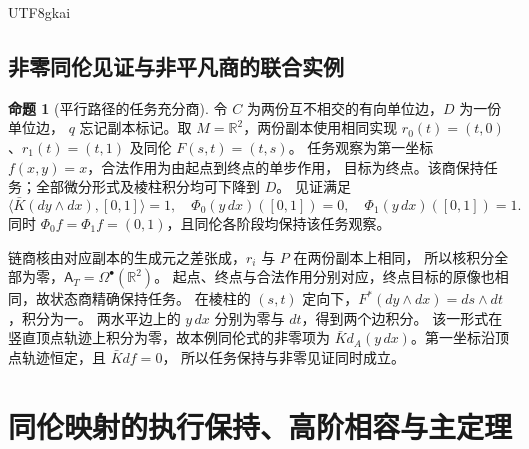 \documentclass[12pt]{report}
\makeatletter
\theoremstyle{definition}
\newtheorem{proposition}{命题}[chapter]
\renewenvironment{proof}[1][\proofname]{\par
  \pushQED{\qed}\normalfont
  \topsep6\p@\@plus6\p@\relax
  \trivlist
  \item[\hskip\labelsep\normalfont #1\@addpunct{.}]\ignorespaces
}{
  \popQED\endtrivlist\@endpefalse
}
\newcommand{\RR}{\mathbb R}
\makeatother
\begin{document}
\begin{CJK*}{UTF8}{gkai}
\section{非零同伦见证与非平凡商的联合实例}
\begin{proposition}[平行路径的任务充分商]
\label{prop:parallel-homotopy-model}
令 \(C\) 为两份互不相交的有向单位边，\(D\) 为一份单位边，
\(q\) 忘记副本标记。取 \(M=\RR^2\)，两份副本使用相同实现
\(r_0(t)=(t,0)\)、\(r_1(t)=(t,1)\) 及同伦 \(F(s,t)=(t,s)\)。
任务观察为第一坐标 \(f(x,y)=x\)，合法作用为由起点到终点的单步作用，
目标为终点。该商保持任务；全部微分形式及棱柱积分均可下降到 \(D\)。
见证满足
\[
\langle\bar K(dy\wedge dx),[0,1]\rangle=1,
\quad \Phi_0(y\,dx)([0,1])=0,
\quad \Phi_1(y\,dx)([0,1])=1.
\]
同时 \(\Phi_0f=\Phi_1f=(0,1)\)，且同伦各阶段均保持该任务观察。
\end{proposition}
\begin{proof}
链商核由对应副本的生成元之差张成，\(r_i\) 与 \(P\) 在两份副本上相同，
所以核积分全部为零，\(\mathsf A_T=\Omega^\bullet(\RR^2)\)。
起点、终点与合法作用分别对应，终点目标的原像也相同，故状态商精确保持任务。
在棱柱的 \((s,t)\) 定向下，\(F^*(dy\wedge dx)=ds\wedge dt\)，积分为一。
两水平边上的 \(y\,dx\) 分别为零与 \(dt\)，得到两个边积分。
该一形式在竖直顶点轨迹上积分为零，故本例同伦式的非零项为
\(\bar Kd_A(y\,dx)\)。第一坐标沿顶点轨迹恒定，且 \(\bar Kdf=0\)，
所以任务保持与非零见证同时成立。
\end{proof}

\chapter{同伦映射的执行保持、高阶相容与主定理}
\label{sec:comparison-main}

\end{CJK*}
\end{document}
